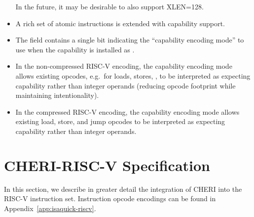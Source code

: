 \begin{itemize}
  In the future, it may be desirable to also support XLEN=128.
\item A rich set of atomic instructions is extended with capability
  support.
\item The \cflags{} field contains a single bit indicating the ``capability
  encoding mode'' to use when the capability is installed as \PCC{}.
\item In the non-compressed RISC-V encoding, the capability encoding mode
  allows existing opcodes, e.g.\ for loads, stores, ,
  to be interpreted as expecting capability rather than integer operands
  (reducing opcode footprint while maintaining intentionality).
\item In the compressed RISC-V encoding, the capability encoding mode allows
  existing load, store, and jump opcodes to be interpreted as expecting
  capability rather than integer operands.

%
\end{itemize}

\section{CHERI-RISC-V Specification}

In this section, we describe in greater detail the integration of CHERI into
the RISC-V instruction set.
Instruction opcode encodings can be found in
Appendix~\ref{app:isaquick-riscv}.

